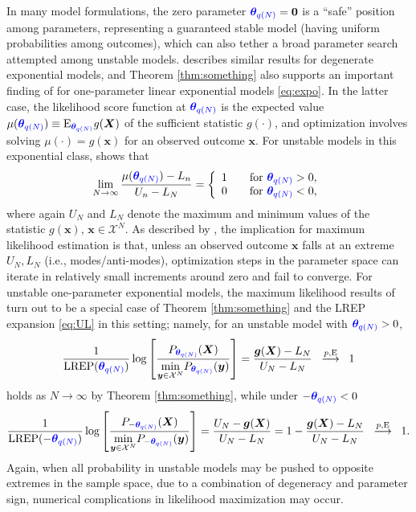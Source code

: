 \documentclass[numbib]{imamat}
\theoremstyle{theorem}
\theoremstyle{lemma}
\theoremstyle{example}
\theoremstyle{corollary}
\theoremstyle{definition}
\theoremstyle{remark}
\theoremstyle{approximation}
\theoremstyle{scheme}
\newcommand{\REP}{\mathrm{LREP}}
\newcommand{\thetaidx}{q(N)}
\newcommand{\thetaN}{\boldsymbol \theta_{\thetaidx}}
\newcommand{\ak}[1]{{\color{blue} #1}}
\begin{document}
In many model formulations, the zero parameter \(\ak{\thetaN}=\boldsymbol 0\) is a ``safe'' position among parameters, representing a guaranteed stable model (having uniform probabilities among outcomes), which can also tether a broad parameter search attempted among unstable models. \citet{handcock2003assessing} describes similar results for degenerate exponential models, and Theorem \ref{thm:something} also supports an important finding of \citet[Corollary 1]{schweinberger2011instability} for one-parameter linear exponential models \eqref{eq:expo}. In the latter case, the likelihood score function at \(\ak{\thetaN}\) is the expected value \(\mu( \ak{\thetaN})\equiv \mathrm{E}_{\ak{\thetaN}} g(\boldsymbol X)\) of the sufficient statistic \(g(\cdot)\), and optimization involves solving \(\mu(\cdot)=g(\boldsymbol x)\) for an observed outcome \(\boldsymbol x\). For unstable models in this exponential class, \citet[Corollary 1]{schweinberger2011instability} shows
that
\[
\lim_{N\to \infty}\frac{\mu(\ak{\thetaN}) -L_n}{U_n-L_N}= \left\{ \begin{array}{lcl}
1 && \text{for } \ak{\thetaN}>0,\\
0 && \text{for } \ak{\thetaN}<0, \end{array}\right.
\]
where again \(U_N\) and \(L_N\) denote the maximum and minimum values of the statistic \(g(\boldsymbol x)\), \(\boldsymbol x\in\mathcal{X}^N\). As described by \citet{schweinberger2011instability}, the implication for maximum likelihood estimation is that, unless an observed outcome \(\boldsymbol x\) falls at an extreme \(U_N, L_N\) (i.e., modes/anti-modes), optimization steps in the parameter space can iterate in relatively small increments around zero and fail to converge. For unstable one-parameter exponential models, the maximum likelihood results of \citet{schweinberger2011instability} turn out to be a special case of Theorem \ref{thm:something} and the LREP expansion \eqref{eq:UL} in this setting; namely, for an unstable model with \(\ak{\thetaN}>0\),
\[
\frac{1}{\REP(\ak{\thetaN})} \log\left[ \frac{P_{\ak{\thetaN} }(\boldsymbol X) }{\displaystyle{\min_{\boldsymbol y\in\mathcal{X}^N}} P_{ \ak{\thetaN} }(\boldsymbol y)}\right] = \frac{\boldsymbol g(\boldsymbol X) - L_N}{U_N-L_N}\;\;\stackrel{p, \mathrm{E}}{\longrightarrow}\;\; 1
\]
holds as \(N\to \infty\) by Theorem \ref{thm:something}, while under \(-\ak{\thetaN}<0\)
\[
\frac{1}{\REP(-\ak{\thetaN})} \log\left[ \frac{P_{-\ak{\thetaN} }(\boldsymbol X) }{\displaystyle{\min_{\boldsymbol y\in\mathcal{X}^N}} P_{-\ak{\thetaN} }(\boldsymbol y)}\right] = \frac{U_N -\boldsymbol g(\boldsymbol X)}{U_N-L_N} = 1 - \frac{\boldsymbol g(\boldsymbol X) - L_N}{U_N-L_N} \;\;\stackrel{p, \mathrm{E}}{\longrightarrow}\;\; 1.
\]
Again, when all probability in unstable models may be pushed to opposite extremes in the sample space, due to a combination of degeneracy and parameter sign, numerical complications in likelihood maximization may occur.
\end{document}
